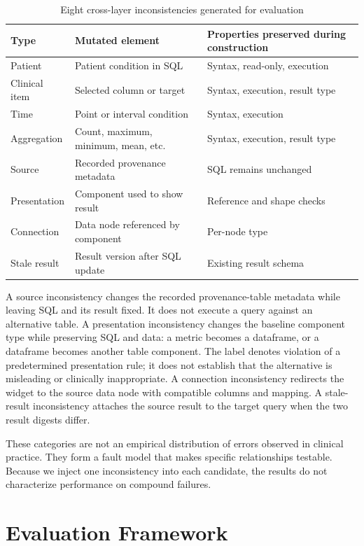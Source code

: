 \documentclass[manuscript,review,anonymous]{acmart}
\begin{document}
\begin{table}[t]
  \caption{Eight cross-layer inconsistencies generated for evaluation}
  \label{tab:mutations}
  \begin{tabularx}{\linewidth}{lYY}
    \toprule
    Type & Mutated element & Properties preserved during construction \\
    \midrule
    Patient & Patient condition in SQL & Syntax, read-only, execution \\
    Clinical item & Selected column or target & Syntax, execution, result type \\
    Time & Point or interval condition & Syntax, execution \\
    Aggregation & Count, maximum, minimum, mean, etc. & Syntax, execution, result type \\
    Source & Recorded provenance metadata & SQL remains unchanged \\
    Presentation & Component used to show result & Reference and shape checks \\
    Connection & Data node referenced by component & Per-node type \\
    Stale result & Result version after SQL update & Existing result schema \\
    \bottomrule
  \end{tabularx}
\end{table}

A source inconsistency changes the recorded provenance-table metadata while leaving SQL and its result fixed. It does not execute a query against an alternative table. A presentation inconsistency changes the baseline component type while preserving SQL and data: a metric becomes a dataframe, or a dataframe becomes another table component. The label denotes violation of a predetermined presentation rule; it does not establish that the alternative is misleading or clinically inappropriate. A connection inconsistency redirects the widget to the source data node with compatible columns and mapping. A stale-result inconsistency attaches the source result to the target query when the two result digests differ.

These categories are not an empirical distribution of errors observed in clinical practice. They form a fault model that makes specific relationships testable. Because we inject one inconsistency into each candidate, the results do not characterize performance on compound failures.

\section{Evaluation Framework}
\end{document}
